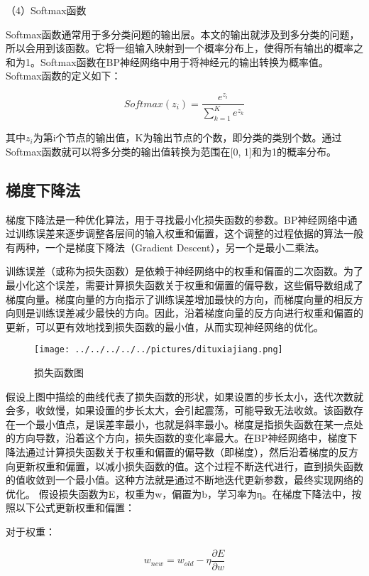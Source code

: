 （4）Softmax函数

Softmax函数通常用于多分类问题的输出层。本文的输出就涉及到多分类的问题，所以会用到该函数。它将一组输入映射到一个概率分布上，使得所有输出的概率之和为1。Softmax函数在BP神经网络中用于将神经元的输出转换为概率值。Softmax函数的定义如下：

\begin{equation}
	Softmax(z_i) = \frac{e^{z_i}}{\sum\limits_{k=1}^{K} e^{z_k}} 
\end{equation}

其中$z_i$为第i个节点的输出值，K为输出节点的个数，即分类的类别个数。通过Softmax函数就可以将多分类的输出值转换为范围在[0, 1]和为1的概率分布。
\fi
\subsection{梯度下降法}
梯度下降法是一种优化算法，用于寻找最小化损失函数的参数。BP神经网络中通过训练误差来逐步调整各层间的输入权重和偏置，这个调整的过程依据的算法一般有两种，一个是梯度下降法（Gradient Descent），另一个是最小二乘法。

训练误差（或称为损失函数）是依赖于神经网络中的权重和偏置的二次函数。为了最小化这个误差，需要计算损失函数关于权重和偏置的偏导数，这些偏导数组成了梯度向量。梯度向量的方向指示了训练误差增加最快的方向，而梯度向量的相反方向则是训练误差减少最快的方向。因此，沿着梯度向量的反方向进行权重和偏置的更新，可以更有效地找到损失函数的最小值，从而实现神经网络的优化。

\begin{figure}[!h]
	\centering
	\texttt{[image: ../../../../../pictures/dituxiajiang.png]}
	\caption{损失函数图}
\end{figure}

假设上图中描绘的曲线代表了损失函数的形状，如果设置的步长太小，迭代次数就会多，收敛慢，如果设置的步长太大，会引起震荡，可能导致无法收敛。该函数存在一个最小值点，是误差率最小，也就是斜率最小。梯度是指损失函数在某一点处的方向导数，沿着这个方向，损失函数的变化率最大。在BP神经网络中，梯度下降法通过计算损失函数关于权重和偏置的偏导数（即梯度），然后沿着梯度的反方向更新权重和偏置，以减小损失函数的值。这个过程不断迭代进行，直到损失函数的值收敛到一个最小值。这种方法就是通过不断地迭代更新参数，最终实现网络的优化。
假设损失函数为E，权重为w，偏置为b，学习率为η。在梯度下降法中，按照以下公式更新权重和偏置：

对于权重：

\begin{equation}
w_{new} = w_{old} - \eta \frac{\partial E}{\partial w}
\end{equation}

